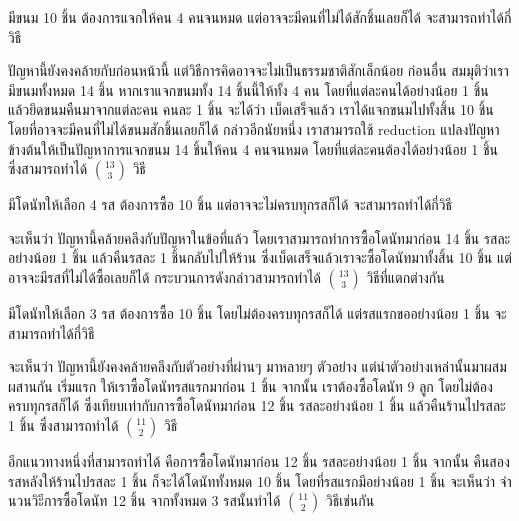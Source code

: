 \begin{example}
มีขนม 10 ชิ้น ต้องการแจกให้คน 4 คนจนหมด แต่อาจจะมีคนที่ไม่ได้สักชิ้นเลยก็ได้ จะสามารถทำได้กี่วิธี

ปัญหานี้ยังคงคล้ายกับก่อนหน้านี้ แต่วิธีการคิดอาจจะไม่เป็นธรรมชาติสักเล็กน้อย \enskip ก่อนอื่น สมมุติว่าเรามีขนมทั้งหมด 14 ชิ้น \enskip หากเราแจกขนมทั้ง 14 ชิ้นนี้ให้ทั้ง 4 คน โดยที่แต่ละคนได้อย่างน้อย 1 ชิ้น แล้วยึดขนมคืนมาจากแต่ละคน คนละ 1 ชิ้น จะได้ว่า เบ็ดเสร็จแล้ว เราได้แจกขนมไปทั้งสิ้น 10 ชิ้น โดยที่อาจจะมีคนที่ไม่ได้ขนมสักชิ้นเลยก็ได้ \enskip กล่าวอีกนัยหนึ่ง เราสามารถใช้ reduction แปลงปัญหาข้างต้นให้เป็นปัญหาการแจกขนม 14 ชิ้นให้คน 4 คนจนหมด โดยที่แต่ละคนต้องได้อย่างน้อย 1 ชิ้น ซึ่งสามารถทำได้ $\binom{13}{3}$ วิธี
\end{example}

\begin{example}
มีโดนัทให้เลือก 4 รส ต้องการซื้อ 10 ชิ้น แต่อาจจะไม่ครบทุกรสก็ได้ จะสามารถทำได้กี่วิธี

จะเห็นว่า ปัญหานี้คล้ายคลึงกับปัญหาในข้อที่แล้ว โดยเราสามารถทำการซื้อโดนัทมาก่อน 14 ชิ้น รสละอย่างน้อย 1 ชิ้น แล้วคืนรสละ 1 ชิ้นกลับไปให้ร้าน ซึ่งเบ็ดเสร็จแล้วเราจะซื้อโดนัทมาทั้งสิ้น 10 ชิ้น แต่อาจจะมีรสที่ไม่ได้ซื้อเลยก็ได้ \enskip กระบวนการดังกล่าวสามารถทำได้ $\binom{13}{3}$ วิธีที่แตกต่างกัน
\end{example}

\begin{example}\label{ex:stars-bars-donuts-first}
มีโดนัทให้เลือก 3 รส ต้องการซื้อ 10 ชิ้น โดยไม่ต้องครบทุกรสก็ได้ แต่รสแรกขออย่างน้อย 1 ชิ้น จะสามารถทำได้กี่วิธี

จะเห็นว่า ปัญหานี้ยังคงคล้ายคลึงกับตัวอย่างที่ผ่านๆ มาหลายๆ ตัวอย่าง แต่นำตัวอย่างเหล่านั้นมาผสมผสานกัน \enskip เริ่มแรก ให้เราซื้อโดนัทรสแรกมาก่อน 1 ชิ้น \enskip จากนั้น เราต้องซื้อโดนัท 9 ลูก โดยไม่ต้องครบทุกรสก็ได้ ซึ่งเทียบเท่ากับการซื้อโดนัทมาก่อน 12 ชิ้น รสละอย่างน้อย 1 ชิ้น แล้วคืนร้านไปรสละ 1 ชิ้น ซึ่งสามารถทำได้ $\binom{11}{2}$ วิธี

อีกแนวทางหนึ่งที่สามารถทำได้ คือการซื้อโดนัทมาก่อน 12 ชิ้น รสละอย่างน้อย 1 ชิ้น จากนั้น คืนสองรสหลังให้ร้านไปรสละ 1 ชิ้น ก็จะได้โดนัททั้งหมด 10 ชิ้น โดยที่รสแรกมีอย่างน้อย 1 ชิ้น \enskip จะเห็นว่า จำนวนวิะีการซื้อโดนัท 12 ชิ้น จากทั้งหมด 3 รสนั้นทำได้ $\binom{11}{2}$ วิธีเช่นกัน
\end{example}

